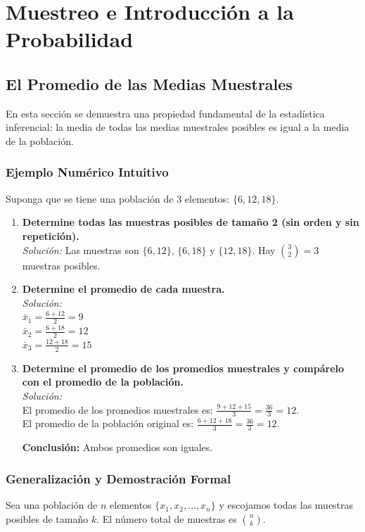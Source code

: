 \documentclass[12pt, letterpaper]{article}
\begin{document}
\newpage

\section{Muestreo e Introducción a la Probabilidad}
\subsection{El Promedio de las Medias Muestrales}
En esta sección se demuestra una propiedad fundamental de la estadística inferencial: la media de todas las medias muestrales posibles es igual a la media de la población.

\subsubsection{Ejemplo Numérico Intuitivo}
Suponga que se tiene una población de 3 elementos: $\{6, 12, 18\}$.
\begin{enumerate}
	\item \textbf{Determine todas las muestras posibles de tamaño 2 (sin orden y sin repetición).} \\
	      \textit{Solución:} Las muestras son $\{6, 12\}$, $\{6, 18\}$ y $\{12, 18\}$. Hay $\binom{3}{2}=3$ muestras posibles.

	\item \textbf{Determine el promedio de cada muestra.} \\
	      \textit{Solución:} \\
	      $\bar{x}_1 = \frac{6+12}{2} = 9$ \\
	      $\bar{x}_2 = \frac{6+18}{2} = 12$ \\
	      $\bar{x}_3 = \frac{12+18}{2} = 15$

	\item \textbf{Determine el promedio de los promedios muestrales y compárelo con el promedio de la población.} \\
	      \textit{Solución:} \\
	      El promedio de los promedios muestrales es: $\frac{9+12+15}{3} = \frac{36}{3} = 12$. \\
	      El promedio de la población original es: $\frac{6+12+18}{3} = \frac{36}{3} = 12$.

	      \textbf{Conclusión:} Ambos promedios son iguales.
\end{enumerate}

\subsubsection{Generalización y Demostración Formal}
Sea una población de $n$ elementos $\{x_1, x_2, \dots, x_n\}$ y escojamos todas las muestras posibles de tamaño $k$. El número total de muestras es $\binom{n}{k}$.
\end{document}
